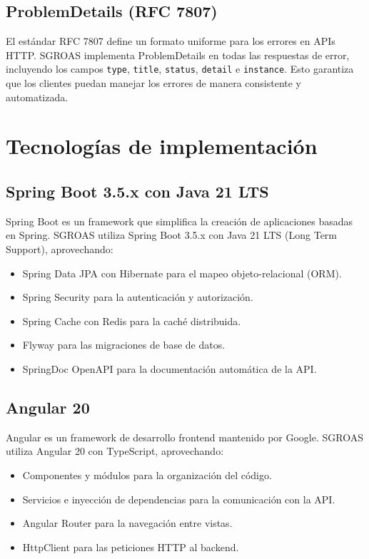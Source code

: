 \subsection{ProblemDetails (RFC 7807)}
\label{sec:rfc7807}

El estándar RFC 7807 \cite{rfc7807} define un formato uniforme para los errores en APIs HTTP. SGROAS implementa ProblemDetails en todas las respuestas de error, incluyendo los campos \texttt{type}, \texttt{title}, \texttt{status}, \texttt{detail} e \texttt{instance}. Esto garantiza que los clientes puedan manejar los errores de manera consistente y automatizada.

\section{Tecnologías de implementación}
\label{sec:tech}

\subsection{Spring Boot 3.5.x con Java 21 LTS}
\label{sec:spring}

Spring Boot \cite{springboot} es un framework que simplifica la creación de aplicaciones basadas en Spring. SGROAS utiliza Spring Boot 3.5.x con Java 21 LTS (Long Term Support), aprovechando:
\begin{itemize}
  \item Spring Data JPA con Hibernate para el mapeo objeto-relacional (ORM).
  \item Spring Security para la autenticación y autorización.
  \item Spring Cache con Redis para la caché distribuida.
  \item Flyway para las migraciones de base de datos.
  \item SpringDoc OpenAPI para la documentación automática de la API.
\end{itemize}

\subsection{Angular 20}
\label{sec:angular}

Angular \cite{angular} es un framework de desarrollo frontend mantenido por Google. SGROAS utiliza Angular 20 con TypeScript, aprovechando:
\begin{itemize}
  \item Componentes y módulos para la organización del código.
  \item Servicios e inyección de dependencias para la comunicación con la API.
  \item Angular Router para la navegación entre vistas.
  \item HttpClient para las peticiones HTTP al backend.
\end{itemize}

